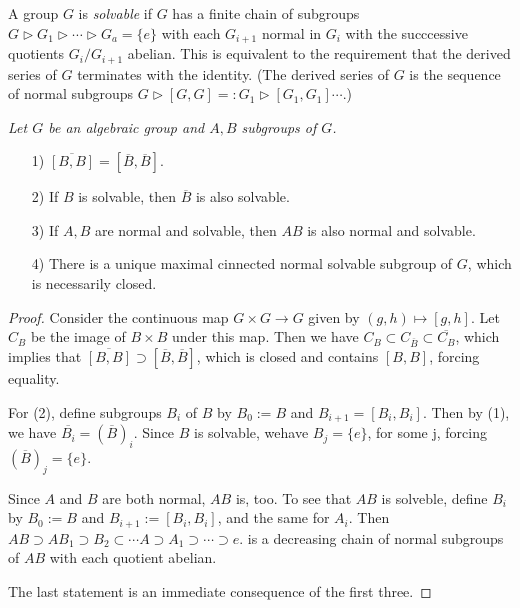 \documentclass[12pt]{amsart}
\begin{document}
A group $G$ is {\sl solvable} if $G$ has a finite chain of subgroups 
$G \vartriangleright G_1 \vartriangleright \cdots
 \vartriangleright G_a = \{e\}$ with each $G_{i+1}$ normal in $G_i$ with the
succcessive quotients $G_{i}/G_{i+1}$ abelian.
This is equivalent to the requirement that the derived series of $G$
terminates with the identity.
(The derived series of $G$ is the sequence of normal subgroups 
$G\vartriangleright [G,G]=:G_1 \vartriangleright [G_1,G_1]\cdots$.)
\medskip


{\it
Let $G$ be an algebraic group and $A,B$ subgroups of $G$.
\begin{enumerate}
 \item[1)] $\overline{[B,B]}=[\overline{B},\overline{B}]$.

 \item[2)] If $B$ is solvable, then $\overline{B}$ is also solvable.

 \item[3)] If $A,B$ are normal and solvable, then $AB$ is also normal and
           solvable. 

 \item[4)] There is a unique maximal cinnected normal solvable subgroup of
    $G$, which is necessarily closed.

\end{enumerate}
}\medskip

\begin{proof}
Consider the continuous map $G\times G\to G$ given by $(g,h)\mapsto [g,h]$.
Let $C_B$ be the image of $B\times B$ under this map.
Then we have $C_B\subset C_{\overline{B}}\subset \overline{C_B}$,
which implies that  $\overline{[B,B]}\supset[\overline{B},\overline{B}]$,
which is closed and contains $[B,B]$, forcing equality.

For (2), define subgroups $B_i$ of $B$ by $B_0:=B$ and $B_{i+1}=[B_i,B_i]$.
Then by (1), we have $\overline{B_i}= (\overline{B})_i$.
Since $B$ is solvable, wehave $B_j=\{e\}$, for some j, forcing
$(\overline{B})_j=\{e\}$.


Since $A$ and $B$ are both normal, $AB$ is, too.
To see that $AB$ is solveble, define $B_i$ by $B_0:=B$ and
$B_{i+1}:=[B_i,B_i]$, and the same for $A_i$.
Then $AB\supset AB_1\supset B_2 \subset \cdots A \supset A_1 \supset \cdots
\supset {e}$. is a decreasing chain of normal subgroups of $AB$ with each
quotient abelian.


The last statement is an immediate consequence of the first three.
\end{proof}
\end{document}
